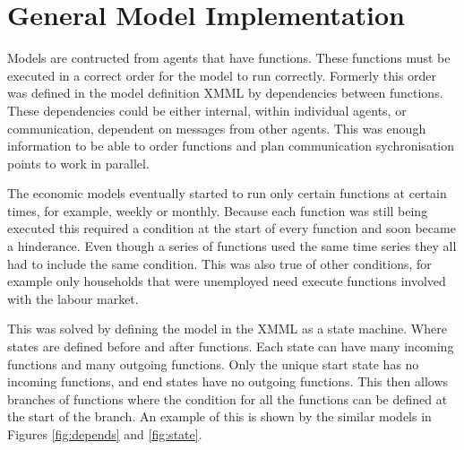 \section{General Model Implementation}


Models are contructed from agents that have functions. These functions must be
executed in a correct order for the model to run correctly. Formerly this order
was defined in the model definition XMML by dependencies between functions. These
dependencies could be either internal, within individual agents, or
communication, dependent on messages from other agents. This was enough
information to be able to order functions and plan communication sychronisation
points to work in parallel.

The economic models eventually started to run only certain functions at
certain times, for example, weekly or monthly. Because each function
was still being executed this required a condition at the start of every
function and soon became a hinderance. Even though a series of functions used
the same time series they all had to include the same condition. This was also
true of other conditions, for example only households that were unemployed need
execute functions involved with the labour market.

This was solved by defining the model in the XMML as a state machine. Where
states are defined before and after functions.
Each state can have many incoming functions and many outgoing functions.
Only the unique start state has no incoming functions, and end states have no
outgoing functions. This then allows branches of functions where the condition
for all the functions can be defined at the start of the branch.
An example of this is shown by the similar models in Figures \ref{fig:depends}
and \ref{fig:state}.

